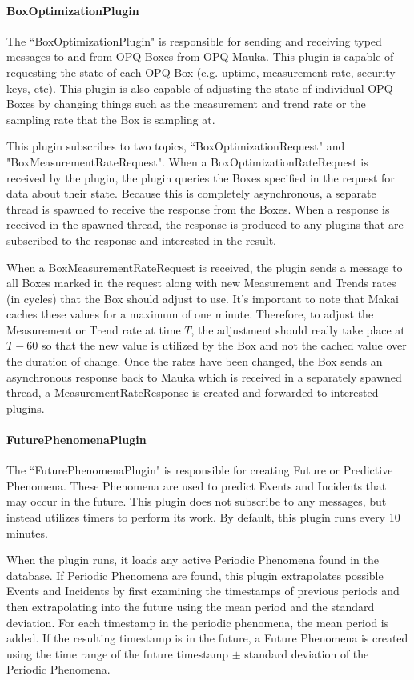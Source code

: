 \paragraph{BoxOptimizationPlugin}

The ``BoxOptimizationPlugin" is responsible for sending and receiving typed messages to and from OPQ Boxes from OPQ Mauka. This plugin is capable of requesting the state of each OPQ Box (e.g. uptime, measurement rate, security keys, etc). This plugin is also capable of adjusting the state of individual OPQ Boxes by changing things such as the measurement and trend rate or the sampling rate that the Box is sampling at.

This plugin subscribes to two topics, ``BoxOptimizationRequest" and "BoxMeasurementRateRequest". When a BoxOptimizationRateRequest is received by the plugin, the plugin queries the Boxes specified in the request for data about their state. Because this is completely asynchronous, a separate thread is spawned to receive the response from the Boxes. When a response is received in the spawned thread, the response is produced to any plugins that are subscribed to the response and interested in the result.

When a BoxMeasurementRateRequest is received, the plugin sends a message to all Boxes marked in the request along with new Measurement and Trends rates (in cycles) that the Box should adjust to use. It's important to note that Makai caches these values for a maximum of one minute. Therefore, to adjust the Measurement or Trend rate at time $T$, the adjustment should really take place at $T - 60$ so that the new value is utilized by the Box and not the cached value over the duration of change. Once the rates have been changed, the Box sends an asynchronous response back to Mauka which is received in a separately spawned thread, a MeasurementRateResponse is created and forwarded to interested plugins.

\paragraph{FuturePhenomenaPlugin}

The ``FuturePhenomenaPlugin" is responsible for creating Future or Predictive Phenomena. These Phenomena are used to predict Events and Incidents that may occur in the future. This plugin does not subscribe to any messages, but instead utilizes timers to perform its work. By default, this plugin runs every 10 minutes.

When the plugin runs, it loads any active Periodic Phenomena found in the database. If Periodic Phenomena are found, this plugin extrapolates possible Events and Incidents by first examining the timestamps of previous periods and then extrapolating into the future using the mean period and the standard deviation. For each timestamp in the periodic phenomena, the mean period is added. If the resulting timestamp is in the future, a Future Phenomena is created using the time range of the future timestamp $\pm$ standard deviation of the Periodic Phenomena.

